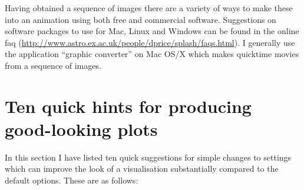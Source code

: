 \documentclass[a4paper,11pt]{article}
\begin{document}
 Having obtained a sequence of images there are a variety of ways to make these into an animation using both free and commercial software. Suggestions on software packages to use for Mac, Linux and Windows can be found in the online faq (\url{http://www.astro.ex.ac.uk/people/dprice/splash/faqs.html}). I generally use the application ``graphic converter'' on Mac OS/X which makes quicktime movies from a sequence of images.
 
 
\section{Ten quick hints for producing good-looking plots}
In this section I have listed ten quick suggestions for simple changes to settings which can improve the look of a visualisation substantially compared to the default options. These are as follows:
\end{document}
